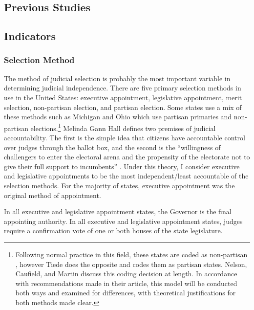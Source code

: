 \documentclass[12pt]{article}
\begin{document}
\subsection*{Previous Studies}%




\subsection*{Indicators}
\subsubsection*{Selection Method}
The method of judicial selection is probably the most important variable in determining judicial independence. There are five primary selection methods in use in the United States: executive appointment, legislative appointment, merit selection, non-partisan election, and partisan election. Some states use a mix of these methods such as Michigan and Ohio which use partisan primaries and non-partisan elections.\footnote{Following normal practice in this field, these states are coded as non-partisan \citep{Canes-Wrone2012, Caldarone2009}, however Tiede \citeyearpar{Tiede2006} does the opposite and codes them as partisan states. Nelson, Caufield, and Martin \citeyearpar{Nelson2013} discuss this coding decision at length.  In accordance with recommendations made in their article, this model will be conducted both ways and examined for differences, with theoretical justifications for both methods made clear.  }  Melinda Gann Hall \citeyearpar{Hall2007} defines two premises of judicial accountability. The first is the simple idea that citizens have accountable control over judges through the ballot box, and the second is the ``willingness of challengers to enter the electoral arena and the propensity of the electorate not to give their full support to incumbents'' \citep{Hall2007}.  Under this theory, I consider executive and legislative appointments to be the most independent/least accountable of the selection methods.  For the majority of states, executive appointment was the original method of appointment.  

In all executive and legislative appointment states, the Governor is the final appointing authority.  In all executive and legislative appointment states, judges require a confirmation vote of one or both houses of the state legislature. 
\end{document}

